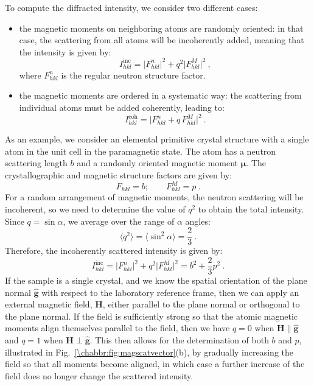 \noindent To compute the diffracted intensity, we consider two different cases:
\begin{itemize}
	\item the magnetic moments on neighboring atoms are randomly oriented: in that case, the scattering from all atoms will be incoherently added, meaning that the intensity is given by:
	\begin{equation}
		I^{\text{inc}}_{hkl} = \vert F^n_{hkl}\vert^2+q^2\vert F^M_{hkl}\vert^2\ ,
	\end{equation}
	where $F^n_{hkl}$ is the regular neutron structure factor.
	\item the magnetic moments are ordered in a systematic way: the scattering from individual atoms must be added coherently, leading to:
	\begin{equation}
		I^{\text{coh}}_{hkl} = \vert F^n_{hkl}+q\, F^M_{hkl}\vert^2\ .
	\end{equation}
\end{itemize}
As an example, we consider an elemental primitive crystal structure with a single atom in the unit cell in the paramagnetic state.  The atom has a neutron scattering length $b$ and a randomly oriented magnetic moment $\bm{\mu}$.  The crystallographic and magnetic structure factors are given by:
\[
	F_{hkl} = b;\qquad F^M_{hkl}= p\ .
\]
For a random arrangement of magnetic moments, the neutron scattering will be incoherent, so we need to determine the value of $q^2$ to obtain the total intensity.  Since $q=\sin\alpha$, we average over the range of $\alpha$ angles:
\[
	\langle q^2\rangle = \langle \sin^2\alpha\rangle = \frac{2}{3}\ .
\]
Therefore, the incoherently scattered intensity is given by:
\[
	I^{\text{inc}}_{hkl} = \vert F^n_{hkl}\vert^2+q^2\vert F^M_{hkl}\vert^2 = b^2+\frac{2}{3}p^2\ .
\]
If the sample is a single crystal, and we know the spatial orientation of the plane normal $\hat{\mathbf{g}}$ with respect to the laboratory reference frame, then we can apply an external magnetic field, $\mathbf{H}$, either parallel to the plane normal or orthogonal to the plane normal. If the field is sufficiently strong so that the atomic magnetic moments align themselves parallel to the field, then we have $q=0$ when $\mathbf{H}\parallel \hat{\mathbf{g}}$ and $q=1$ when $\mathbf{H}\perp\hat{\mathbf{g}}$.  This then allows for the determination of both $b$ and $p$, illustrated in Fig.~\ref{\chabbr:fig:magscatvector}(b), by gradually increasing the field so that all moments become aligned, in which case a further increase of the field does no longer change the scattered intensity.  

